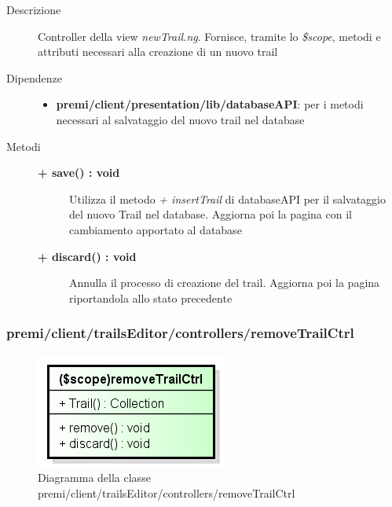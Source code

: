 \begin{description}
\item[Descrizione] \hfill
	Controller della view \textit{newTrail.ng}. Fornisce, tramite lo \textit{\$scope}, metodi e attributi necessari alla creazione di un nuovo trail
	
	
\item[Dipendenze] \hfill
	\begin{itemize}
		\item \textbf{premi/client/presentation/lib/databaseAPI}: per i metodi necessari al salvataggio del nuovo trail nel database
	\end{itemize}
	
	
\item[Metodi] \hfill

	\begin{description}
		\item[\textbf{\color{blue}+ save() : void			}] \hfill
			Utilizza il metodo \textit{+ insertTrail} di databaseAPI per il salvataggio del nuovo Trail nel database. Aggiorna poi la pagina con il cambiamento apportato al database
	\end{description}
	
	\begin{description}
		\item[\textbf{\color{blue}+ discard() : void			}] \hfill
			Annulla il processo di creazione del trail. Aggiorna poi la pagina riportandola allo stato precedente
	\end{description}

\end{description}
	






\subsubsection{premi/client/trailsEditor/controllers/removeTrailCtrl}
\begin{figure}[h]
\begin{center}
\includegraphics[scale=0.55]{img/diacla/removeTrailCtrl.png}
\caption{Diagramma della classe premi/client/trailsEditor/controllers/removeTrailCtrl}
\end{center}
\end{figure}


